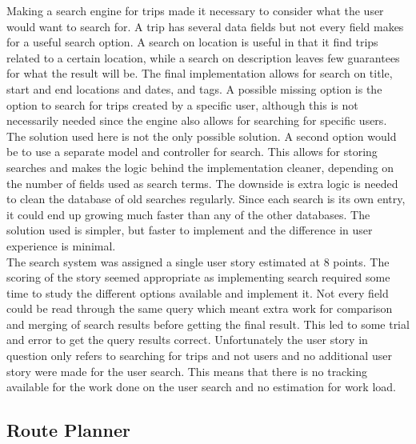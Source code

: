 \documentclass[a4paper]{article}
\begin{document}
\noindent
Making a search engine for trips made it necessary to consider what the user would want to search for. A trip has several data fields but not every field makes for a useful search option. A search on location is useful in that it find trips related to a certain location, while a search on description leaves few guarantees for what the result will be. The final implementation allows for search on title, start and end locations and dates, and tags. A possible missing option is the option to search for trips created by a specific user, although this is not necessarily needed since the engine also allows for searching for specific users.\\

\noindent
The solution used here is not the only possible solution. A second option would be to use a separate model and controller for search. This allows for storing searches and makes the logic behind the implementation cleaner, depending on the number of fields used as search terms. The downside is extra logic is needed to clean the database of old searches regularly. Since each search is its own entry, it could end up growing much faster than any of the other databases. The solution used is simpler, but faster to implement and the difference in user experience is minimal.\\

\noindent
The search system was assigned a single user story estimated at 8 points. The scoring of the story seemed appropriate as implementing search required some time to study the different options available and implement it. Not every field could be read through the same query which meant extra work for comparison and merging of search results before getting the final result. This led to some trial and error to get the query results correct. Unfortunately the user story in question only refers to searching for trips and not users and no additional user story were made for the user search. This means that there is no tracking available for the work done on the user search and no estimation for work load.


\subsection{Route Planner}
\end{document}
